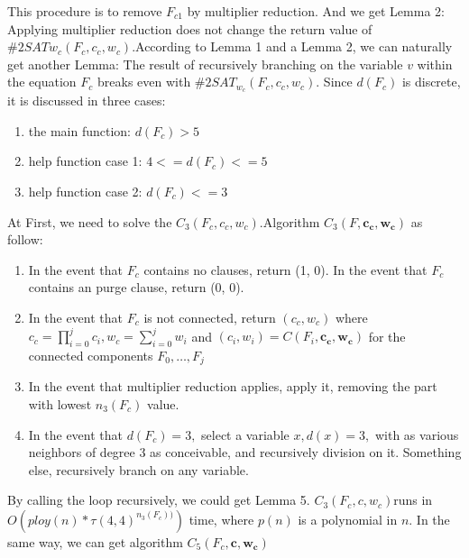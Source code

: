 \documentclass{sigchi}
\begin{document}
This procedure is to remove $F_{c1}$ by multiplier reduction. And we get Lemma 2: Applying multiplier reduction does not change the return value of $\#2SAT w_{c} (F_{c}, c_{c}, w_{c})$.According to Lemma 1 and a Lemma 2, we can naturally get another Lemma: The result of recursively branching on the variable $v$ within the equation $F_{c}$  breaks even with $\#2SAT_{w_{c}}(F_{c}, c_{c}, w_{c})$. Since $d(F_{c})$ is discrete, it is discussed in three cases:
\begin{enumerate}
	\item the main function: $d(F_{c})>5$
	\item help function case 1: $4<=d(F_{c})<=5$
	\item help function case 2: $d(F_{c})<=3$
\end{enumerate}
At First, we need to solve the $C_{3}(F_{c},c_{c},w_{c})$.Algorithm $C_{3}(F, \mathbf{c_{c}}, \mathbf{w_{c}})$ as follow:
\begin{enumerate}	
	\item  In the event that $F_{c}$ contains no clauses, return (1, 0). In the event that $F_{c}$ contains an purge clause, return (0, 0).
	\item In the event that $F_{c}$ is not connected, return $(c_{c}, w_{c})$ where $c_{c}=\prod_{i=0}^{j} c_{i}, w_{c}=\sum_{i=0}^{j} w_{i}$ and $\left(c_{i}, w_{i}\right)=C\left(F_{i}, \mathbf{c_{c}}, \mathbf{w_{c}}\right)$ for the connected components $F_{0}, \ldots, F_{j}$
	\item In the event that multiplier reduction applies, apply it, removing the part with lowest $n_{3}(F_{c})$ value.
	\item  In the event that $d(F_{c})=3,$ select a variable $x, d(x)=3,$ with as various neighbors of degree 3 as conceivable, and recursively division on it. Something else, recursively branch on any variable.
\end{enumerate}
By calling the loop recursively, we could get Lemma 5. $C_{3}(F_{c} ,c,w_{c})$runs in $O(ploy(n)*\tau(4,4)^{n_{3}(F_{c}))})$ time, where $p(n)$ is a polynomial in $n$. In the same way, we can get	algorithm $C_{5}(F_{c}, \mathbf{c}, \mathbf{w_{c}})$
\end{document}
